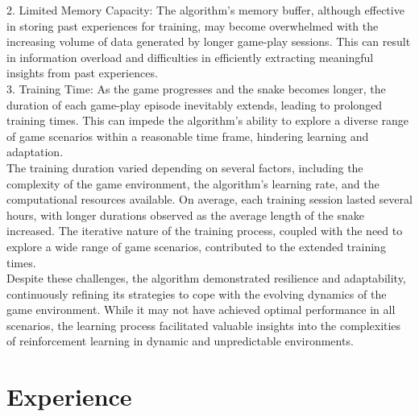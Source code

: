 \documentclass[paper=a4, fontsize=11pt,twoside]{scrartcl}
\begin{document}
2. Limited Memory Capacity: The algorithm's memory buffer, although effective in storing past experiences for training, may become overwhelmed with the increasing volume of data generated by longer game-play sessions. This can result in information overload and difficulties in efficiently extracting meaningful insights from past experiences.\\

3. Training Time: As the game progresses and the snake becomes longer, the duration of each game-play episode inevitably extends, leading to prolonged training times. This can impede the algorithm's ability to explore a diverse range of game scenarios within a reasonable time frame, hindering learning and adaptation.\\ 

The training duration varied depending on several factors, including the complexity of the game environment, the algorithm's learning rate, and the computational resources available. On average, each training session lasted several hours, with longer durations observed as the average length of the snake increased. The iterative nature of the training process, coupled with the need to explore a wide range of game scenarios, contributed to the extended training times.\\

Despite these challenges, the algorithm demonstrated resilience and adaptability, continuously refining its strategies to cope with the evolving dynamics of the game environment. While it may not have achieved optimal performance in all scenarios, the learning process facilitated valuable insights into the complexities of reinforcement learning in dynamic and unpredictable environments.\\

\section{Experience}
\end{document}
